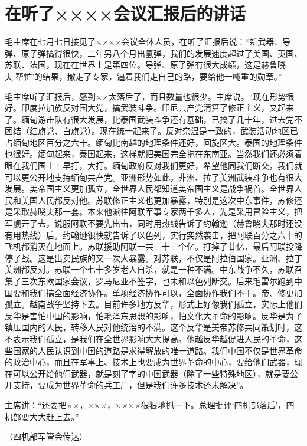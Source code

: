 \section[在听了××××会议汇报后的讲话（一九六七年七月七日）]{在听了××××会议汇报后的讲话}


毛主席在七月七日接见了××××会议全体人员，在听了汇报后说：“新武器、导弹、原子弹搞得很快，二年另八个月出氢弹，我们的发展速度超过了美国、英国、苏联、法国，现在在世界上是第四位。导弹、原子弹有很大成绩，这是赫鲁晓夫‘帮忙’的结果，撤走了专家，逼着我们走自己的路，要给他一吨重的勋章。”

毛主席听了汇报后，感到××太落后了，而且数量也很少。主席说。“现在形势很好。印度拉加族反对国大党，搞武装斗争。印尼共产党清算了修正主义，又起来了。缅甸游击队有很大发展，比泰国武装斗争还有基础，已搞了几十年，过去党不团结（红旗党、白旗党）。现在统一起来了。反对奈温是一致的，武装活动地区已占缅甸地区百分之六十。缅甸比南越的地理条件还好，回旋区大。泰国的地理条件也很好。缅甸起来，泰国起来，这样就把美国完全拖在东南亚。当然我们还必须着眼在我们国土上早打，大打。缅甸政府反对我们更好，希望他同我们断交，我们就可以更公开地支持缅甸共产党。亚洲形势如此，非洲、拉了美洲武装斗争也有很大发展。美帝国主义更加孤立，全世界人民都知道美帝国主义是战争祸首。全世界人民和美国人民都反对他。苏联修正主义也更加暴露，特别是这次中东事件，苏修还是采取赫晓夫那一套。本来他派往阿联军事专家两千多人，先是采用冒险主义，把军舰开了去，说服阿联不要先出击，同时用热线告诉了约翰逊（赫鲁晓夫那时还没有用热线）后。约翰逊很快就告诉了以色列，实行突然袭击，把阿联百分之六十的飞机都消灭在地面上。苏联援助阿联一共三十三个亿。打掉了廿亿，最后阿联投降停了战。这是出卖民族的又一次大暴露。对苏联，不仅是阿拉伯国家。亚洲、拉丁美洲都反对。苏联一个七十多岁老人自杀，就是一种不满。中东战争不久，苏联召集了三次东欧国家会议，罗马尼亚不签字，也未和以色列断交。后来毛雷尔跑到中国要和我们搞全面经济协作。单项经济协作可以，全面协作我们不干。帝、修更加孤立。越南战争坚持下去。目前许多地方反华，形式上好像我们孤立，实际上他们反华是害怕中国的影响，怕毛泽东思想的影响，怕文化大革命的影响。反华是为了镇压国内的人民，转移人民对他统治的不满。这个反华是美帝苏修共同策划吋，这不表示我们孤立，是我们在全世界影响大大提高。他越反华越促进人民的革命，这些国家的人民认识到中国的道路是求得解放的唯一道路。我们中国不仅是世界革命的政治中心，而且在军事上、技术上也要成为世界革命的中心，要给他们武器，现在可以公开给他们武器，就是刻了字的中国武器（除了一些特殊地区），就是要公开支持，要成为世界革命的兵工厂，但是我们许多技术还未解决”。

主席讲：“还要把××，×××，××××狠狠地抓一下。总理批评‘四机部落后’，四机部要大大赶上去。”

{\raggedleft （四机部军管会传达）\par}


